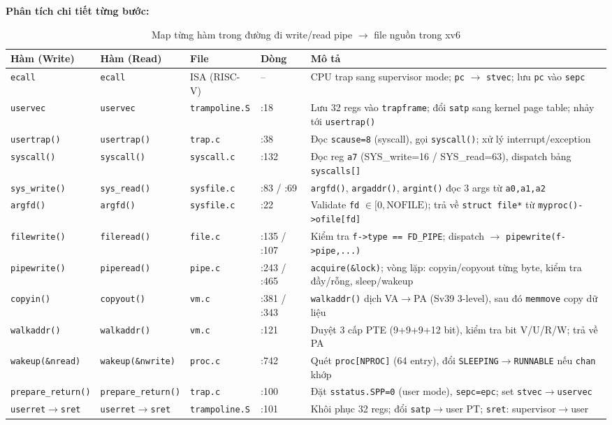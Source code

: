 \documentclass[12pt,a4paper]{article}
\newcommand{\code}[1]{\texttt{#1}}
\begin{document}
\textbf{Phân tích chi tiết từng bước:}

\begin{table}[H]
\centering
\scriptsize
\setlength{\tabcolsep}{3pt}
\renewcommand{\arraystretch}{0.88}
\caption{Map từng hàm trong đường đi write/read pipe $\to$ file nguồn trong xv6}
\begin{tabularx}{\linewidth}{p{2.7cm}p{2.7cm}p{2.1cm}p{1.9cm}X}
\toprule
\textbf{Hàm (Write)} & \textbf{Hàm (Read)} & \textbf{File} & \textbf{Dòng} & \textbf{Mô tả} \\
\midrule
\code{ecall} & \code{ecall}
  & ISA (RISC-V) & -- & CPU trap sang supervisor mode; \code{pc} $\to$ \code{stvec}; lưu \code{pc} vào \code{sepc} \\
\code{uservec} & \code{uservec}
  & \code{trampoline.S} & :18 & Lưu 32 regs vào \code{trapframe}; đổi \code{satp} sang kernel page table; nhảy tới \code{usertrap()} \\
\code{usertrap()} & \code{usertrap()}
  & \code{trap.c} & :38 & Đọc \code{scause=8} (syscall), gọi \code{syscall()}; xử lý interrupt/exception \\
\code{syscall()} & \code{syscall()}
  & \code{syscall.c} & :132 & Đọc reg \code{a7} (SYS\_write=16 / SYS\_read=63), dispatch bảng \code{syscalls[]} \\
\code{sys\_write()} & \code{sys\_read()}
  & \code{sysfile.c} & :83 / :69 & \code{argfd()}, \code{argaddr()}, \code{argint()} đọc 3 args từ \code{a0,a1,a2} \\
\code{argfd()} & \code{argfd()}
  & \code{sysfile.c} & :22 & Validate \code{fd} $\in [0,\text{NOFILE})$; trả về \code{struct file*} từ \code{myproc()->ofile[fd]} \\
\code{filewrite()} & \code{fileread()}
  & \code{file.c} & :135 / :107 & Kiểm tra \code{f->type == FD\_PIPE}; dispatch $\to$ \code{pipewrite(f->pipe,...)} \\
\code{pipewrite()} & \code{piperead()}
  & \code{pipe.c} & :243 / :465 & \code{acquire(\&lock)}; vòng lặp: copyin/copyout từng byte, kiểm tra đầy/rỗng, sleep/wakeup \\
\code{copyin()} & \code{copyout()}
  & \code{vm.c} & :381 / :343 & \code{walkaddr()} dịch VA$\to$PA (Sv39 3-level), sau đó \code{memmove} copy dữ liệu \\
\code{walkaddr()} & \code{walkaddr()}
  & \code{vm.c} & :121 & Duyệt 3 cấp PTE (9+9+9+12 bit), kiểm tra bit V/U/R/W; trả về PA \\
\code{wakeup(\&nread)} & \code{wakeup(\&nwrite)}
  & \code{proc.c} & :742 & Quét \code{proc[NPROC]} (64 entry), đổi \code{SLEEPING$\to$RUNNABLE} nếu \code{chan} khớp \\
\code{prepare\_return()} & \code{prepare\_return()}
  & \code{trap.c} & :100 & Đặt \code{sstatus.SPP=0} (user mode), \code{sepc=epc}; set \code{stvec$\to$uservec} \\
\code{userret$\to$sret} & \code{userret$\to$sret}
  & \code{trampoline.S} & :101 & Khôi phục 32 regs; đổi \code{satp}$\to$user PT; \code{sret}: supervisor$\to$user \\
\bottomrule
\end{tabularx}
\renewcommand{\arraystretch}{1}
\end{table}
\end{document}
